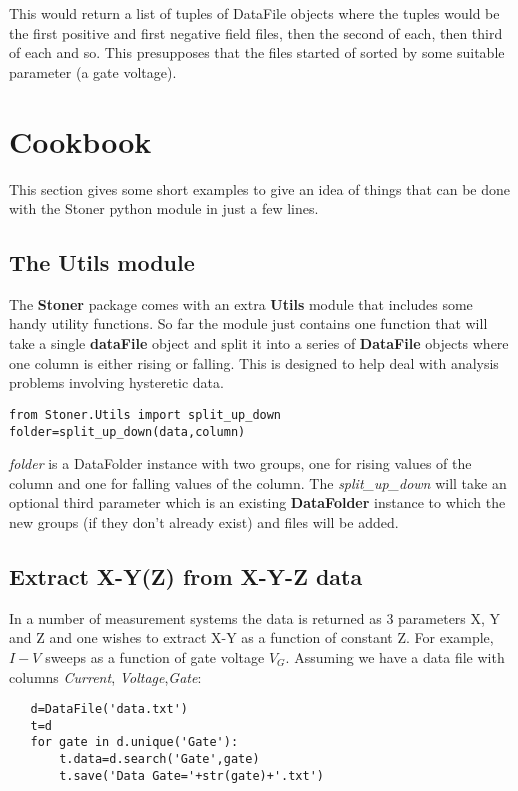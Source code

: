 \documentclass[a4paper,11pt]{scrartcl}
\begin{document}
This would return a list of tuples of DataFile objects where the tuples would be the first positive and first negative field files, then the second of each, then third of each and so. This presupposes that the files started of sorted by some suitable parameter (\eg a gate voltage).



\section{Cookbook}

This section gives some short examples to give an idea of things that can be
done with the Stoner python module in just a few lines.

\subsection{The Utils module}

The \textbf{Stoner} package comes with an extra \textbf{Utils} module that includes some handy utility functions.
So far the module just contains one function that will take a single \textbf{dataFile} object and split it
into a series of \textbf{DataFile} objects where one column is either rising or falling. This is designed to help
deal with analysis problems involving hysteretic data.
\begin{lstlisting}
from Stoner.Utils import split_up_down
folder=split_up_down(data,column)
\end{lstlisting}
\textit{folder} is a DataFolder instance with two groups, one for rising values of the column and one for falling values of the column. The \textit{split\_up\_down} will take an optional third parameter which is an existing \textbf{DataFolder} instance to which the new groups (if they don't already exist) and files will be added.

\subsection{Extract X-Y(Z) from X-Y-Z data}

In a number of measurement systems the data is returned as 3 parameters X, Y and
Z and one wishes to extract X-Y as a function of constant Z. For example, $I-V$
sweeps as a function of gate voltage $V_G$. Assuming we have a data file with
columns \textit{Current}, \textit{Voltage},\textit{Gate}:

\begin{lstlisting}
   d=DataFile('data.txt')
   t=d
   for gate in d.unique('Gate'):
       t.data=d.search('Gate',gate)
       t.save('Data Gate='+str(gate)+'.txt')
\end{lstlisting}
\end{document}
